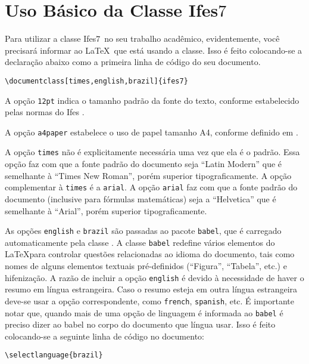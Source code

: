 \documentclass[times,english,brazil,oneside]{ifes8}
\newcommand{\ifestex}{\textsf{Ifes$7$}}
\begin{document}
\section{Uso Básico da Classe \ifestex}
\label{sec:uso-basico}

Para utilizar a classe \ifestex\ no seu trabalho acadêmico,
evidentemente, você precisará informar ao \LaTeX\ que está usando a
classe. Isso é feito colocando-se a declaração abaixo como a primeira
linha de código do seu documento.\vspace{\baselineskip}

\begin{lstlisting}[language={[LaTeX]TeX}]
  \documentclass[times,english,brazil]{ifes7}  
\end{lstlisting}

A opção \texttt{12pt} indica o tamanho padrão da fonte do texto,
conforme estabelecido pelas normas do Ifes \cite[pp.~20]{Ifes2014}.

A opção \texttt{a4paper} estabelece o uso de papel tamanho A4,
conforme definido em \cite[pp.~19]{Ifes2014}.

A opção \texttt{times} não é explicitamente necessária uma vez que ela
é o padrão. Essa opção faz com que a fonte padrão do documento seja
“Latin Modern” que é semelhante à “Times New Roman”, porém superior
tipograficamente. A opção complementar à \texttt{times} é a
\texttt{arial}. A opção \texttt{arial} faz com que a fonte padrão do
documento (inclusive para fórmulas matemáticas) seja a “Helvetica” que
é semelhante à “Arial”, porém superior tipograficamente.

As opções \texttt{english} e \texttt{brazil} são passadas ao pacote
\texttt{babel}, que é carregado automaticamente pela classe \abnTeX.
A classe \texttt{babel} redefine vários elementos do \LaTeX para
controlar questões relacionadas ao idioma do documento, tais como
nomes de alguns elementos textuais pré-definidos (``Figura'',
``Tabela'', etc.) e hifenização. A razão de incluir a opção
\texttt{english} é devido à necessidade de haver o resumo em língua
estrangeira. Caso o resumo esteja em outra língua estrangeira deve-se
usar a opção correspondente, como \texttt{french}, \texttt{spanish},
etc. É importante notar que, quando mais de uma opção de linguagem é
informada ao \texttt{babel} é preciso dizer ao babel no corpo do
documento que língua usar. Isso é feito colocando-se a seguinte linha
de código no documento:\vspace{\baselineskip}

\begin{lstlisting}[language={[LaTeX]TeX}]
  \selectlanguage{brazil}  
\end{lstlisting}
\end{document}
